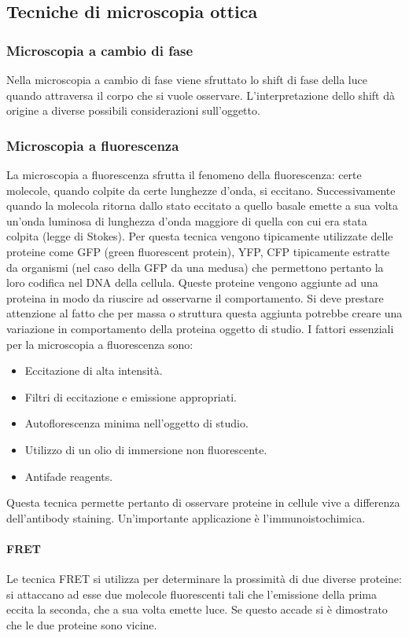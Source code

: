 \subsection{Tecniche di microscopia ottica}
\subsubsection{Microscopia a cambio di fase}
Nella microscopia a cambio di fase viene sfruttato lo shift di fase della luce quando attraversa il corpo che si vuole osservare. L'interpretazione dello 
shift d\`a origine a diverse possibili considerazioni sull'oggetto.
\subsubsection{Microscopia a fluorescenza}
La microscopia a fluorescenza sfrutta il fenomeno della fluorescenza: certe molecole, quando colpite da certe lunghezze d'onda, si eccitano. Successivamente
quando la molecola ritorna dallo stato eccitato a quello basale emette a sua volta un'onda luminosa di lunghezza d'onda maggiore di quella con cui era
stata colpita (legge di Stokes). Per questa tecnica vengono tipicamente utilizzate delle proteine come GFP (green fluorescent protein), YFP, CFP tipicamente
estratte da organismi (nel caso della GFP da una medusa) che permettono pertanto la loro codifica nel DNA della cellula. Queste proteine vengono aggiunte ad
una proteina in modo da riuscire ad osservarne il comportamento. Si deve prestare attenzione al fatto che per massa o struttura questa aggiunta potrebbe 
creare una variazione in comportamento della proteina oggetto di studio. I fattori essenziali per la microscopia a fluorescenza sono:
\begin{itemize}
\item Eccitazione di alta intensit\`a.
\item Filtri di eccitazione e emissione appropriati.
\item Autoflorescenza minima nell'oggetto di studio.
\item Utilizzo di un olio di immersione non fluorescente. 
\item Antifade reagents.
\end{itemize}
Questa tecnica permette pertanto di osservare proteine in cellule vive a differenza dell'antibody staining. Un'importante applicazione \`e 
l'immunoistochimica.
\paragraph{FRET}
Le tecnica FRET si utilizza per determinare la prossimit\`a di due diverse proteine: si attaccano ad esse due molecole fluorescenti tali che l'emissione 
della prima eccita la seconda, che a sua volta emette luce. Se questo accade si \`e dimostrato che le due proteine sono vicine.
